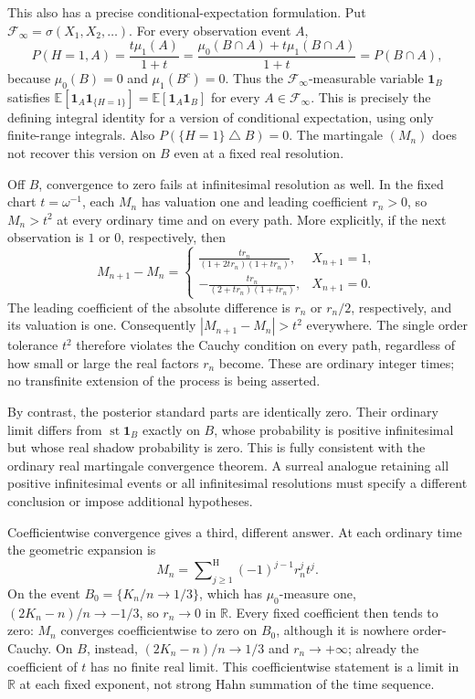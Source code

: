 \documentclass[11pt,a4paper]{article}
\numberwithin{equation}{section}
\theoremstyle{definition}
\theoremstyle{remark}
\newcommand{\R}{\mathbb R}
\newcommand{\E}{\mathbb E}
\newcommand{\F}{\mathcal F}
\newcommand{\st}{\operatorname{st}}
\newcommand{\ind}{\mathbf 1}
\newcommand{\hsum}{\mathop{\sum}\nolimits^{\mathrm H}}
\begin{document}
This also has a precise conditional-expectation formulation. Put
$\F_\infty=\sigma(X_1,X_2,\ldots)$. For every observation event $A$,
\[
 P(H=1,A)=\frac{t\mu_1(A)}{1+t}
 =\frac{\mu_0(B\cap A)+t\mu_1(B\cap A)}{1+t}
 =P(B\cap A),
\]
because $\mu_0(B)=0$ and $\mu_1(B^c)=0$. Thus the $\F_\infty$-measurable
variable $\ind_B$ satisfies
$\E[\ind_A\ind_{\{H=1\}}]=\E[\ind_A\ind_B]$ for every
$A\in\F_\infty$. This is precisely the defining integral identity for a
version of conditional expectation, using only finite-range integrals.
Also $P(\{H=1\}\mathbin{\triangle}B)=0$. The martingale $(M_n)$ does not
recover this version on $B$ even at a fixed real resolution.

Off $B$, convergence to zero fails at infinitesimal resolution as well.
In the fixed chart $t=\omega^{-1}$, each $M_n$ has valuation one and
leading coefficient $r_n>0$, so $M_n>t^2$ at every ordinary time and on
every path. More explicitly, if the next observation is $1$ or $0$,
respectively, then
\[
 M_{n+1}-M_n=
 \begin{cases}
 \displaystyle\frac{tr_n}{(1+2tr_n)(1+tr_n)},&X_{n+1}=1,\\[6pt]
 \displaystyle-\frac{tr_n}{(2+tr_n)(1+tr_n)},&X_{n+1}=0.
 \end{cases}
\]
The leading coefficient of the absolute difference is $r_n$ or $r_n/2$,
respectively, and its valuation is one. Consequently
$|M_{n+1}-M_n|>t^2$ everywhere. The single order tolerance $t^2$ therefore
violates the Cauchy condition on every path, regardless of how small or
large the real factors $r_n$ become. These are ordinary integer times;
no transfinite extension of the process is being asserted.

By contrast, the posterior standard parts are identically zero. Their
ordinary limit differs from $\st\ind_B$ exactly on $B$, whose
probability is positive infinitesimal but whose real shadow probability
is zero. This is fully consistent with the ordinary real martingale
convergence theorem. A surreal analogue retaining all positive
infinitesimal events or all infinitesimal resolutions must specify a
different conclusion or impose additional hypotheses.

Coefficientwise convergence gives a third, different answer. At each
ordinary time the geometric expansion is
\[
 M_n=\hsum_{j\ge1}(-1)^{j-1}r_n^j t^j.
\]
On the event $B_0=\{K_n/n\to1/3\}$, which has $\mu_0$-measure one,
$(2K_n-n)/n\to-1/3$, so $r_n\to0$ in $\R$. Every fixed coefficient
then tends to zero: $M_n$ converges coefficientwise to zero on $B_0$,
although it is nowhere order-Cauchy. On $B$, instead,
$(2K_n-n)/n\to1/3$ and $r_n\to+\infty$; already the coefficient of $t$
has no finite real limit. This coefficientwise statement is a limit in
$\R$ at each fixed exponent, not strong Hahn summation of the time sequence.
\end{document}
